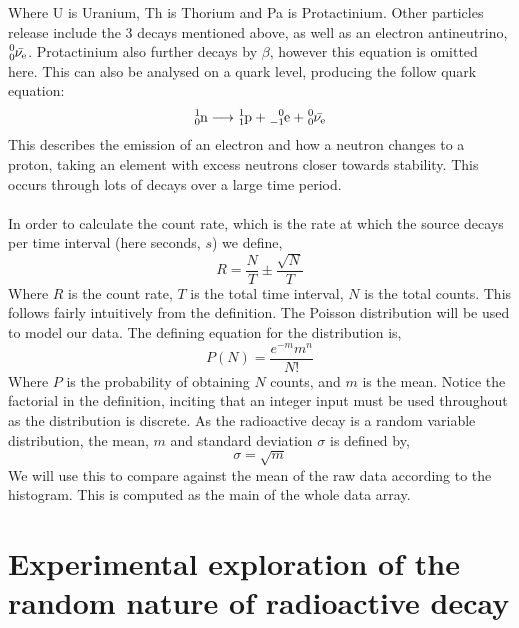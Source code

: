 \documentclass[11pt]{article}
\begin{document}
   Where U is Uranium, Th is Thorium and Pa is Protactinium. Other particles release include the 3 decays mentioned above, as well as an electron antineutrino,$\ce{^{0}_{0}\bar{\nu_{e}}}$. Protactinium also further decays by $\beta$, however this equation is omitted here. This can also be analysed on a quark level, producing the follow quark equation:
 \newline
  \begin{equation} \ce{^{1}_{0}n} \longrightarrow \ce{^{1}_{1}p} + \ce{^{0}_{-1}e} + \ce{^{0}_{0}\bar{\nu_{e}}} 
  \end{equation}
\newline
This describes the emission of an electron and how a neutron changes to a proton, taking an element with excess neutrons closer towards stability. This occurs through lots of decays over a large time period. 
   \\
   \\
   In order to calculate the count rate, which is the rate at which the source decays per time interval (here seconds, $s$)  we define, 
  \begin{equation} 
  R = \frac{N}{T} \pm \frac{\sqrt{N}}{T}
   \end{equation}
   Where $R$ is the count rate, $T$ is the total time interval, $N$ is the total counts. This follows fairly intuitively from the definition. 
    The Poisson distribution will be used to model our data. The defining equation for the distribution is, 
    \begin{equation}
        P(N) = \frac{e^{-m}m^{n}}{N!}
    \end{equation}
    Where $P$ is the probability of obtaining $N$ counts, and $m$ is the mean. Notice the factorial in the definition, inciting that an integer input must be used throughout as the distribution is discrete. 
    As the radioactive decay is a random variable distribution, the mean, $m$ and standard deviation $\sigma$ is defined by,
    \begin{equation}
        \sigma = \sqrt{m}
    \end{equation}
    We will use this to compare against the mean of the raw data according to the histogram. This is computed as the main of the whole data array. 
     \newline 
    \section{Experimental exploration of the random nature of radioactive decay}
\end{document}
